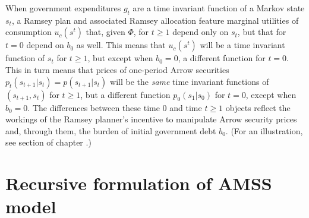 When  government expenditures  $g_t$ are  a time invariant function of a Markov state $s_t$, a Ramsey plan and associated Ramsey allocation
feature marginal utilities of consumption  $u_c(s^t)$
that, given $\Phi$, for $t \geq 1$  depend only on $s_t$, but that for $t=0$ depend on $b_0$ as well.  This means that $u_c(s^t)$ will be a time invariant
function of $s_t$ for $ t\geq 1$, but except when $b_0 = 0$, a different function for $t=0$.  This in turn means that prices of one-period Arrow securities
$p_t(s_{t+1} | s_t) = p(s_{t+1}|s_t)$ will be the {\it same\/} time invariant functions of $(s_{t+1}, s_t)$ for $t \geq 1$, but a different function $p_0(s_1|s_0)$
for $t=0$, except when $b_0=0$.  The differences between these time $0$ and time $t \geq 1$ objects reflect the workings of the Ramsey planner's incentive
to manipulate Arrow security prices and, through them, the burden of initial government debt $b_0$. (For an illustration, see 
section  of chapter .) 



%
%




\section{Recursive formulation of AMSS model}

